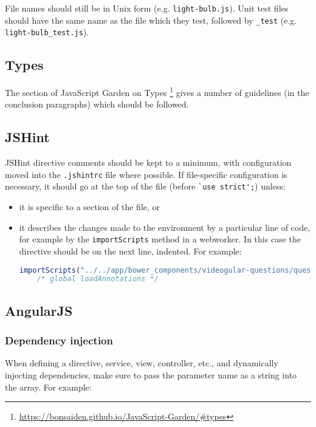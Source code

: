 File names should still be in Unix form (e.g. \texttt{light-bulb.js}).
Unit test files should have the same name as the file which they test,
followed by \texttt{\_test} (e.g. \texttt{light-bulb\_test.js}).

\subsection{Types}

The section of JavaScript Garden on Types
\footnote{\url{https://bonsaiden.github.io/JavaScript-Garden/\#types}}
gives a number of guidelines (in the conclusion paragraphs) which should
be followed.

\subsection{JSHint}

JSHint directive comments should be kept to a minimum, with
configuration moved into the \texttt{.jshintrc} file where possible. If
file-specific configuration is necessary, it should go at the top of the
file (before \lstinline|`use strict';|) unless:

\begin{itemize}
\item
  it is specific to a section of the file, or
\item
  it describes the changes made to the environment by a particular line
  of code, for example by the \texttt{importScripts} method in a \gls{webworker}. In this case the directive should be on the next line,
  indented. For example:

\begin{lstlisting}[language=javascript]
importScripts("../../app/bower_components/videogular-questions/questions-worker.js");
    /* global loadAnnotations */
\end{lstlisting}
\end{itemize}

\subsection{AngularJS}

\subsubsection{Dependency injection}

When defining a directive, service, view, controller, etc., and
dynamically injecting dependencies, make sure to pass the parameter name
as a string into the array. For example:

